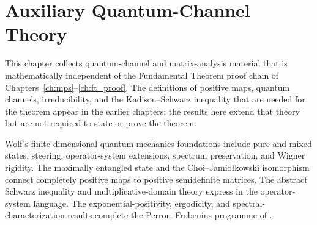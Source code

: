 \chapter{Auxiliary Quantum-Channel Theory}\label{ch:aux_channel_theory}

This chapter collects quantum-channel and matrix-analysis material that is
mathematically independent of the Fundamental Theorem proof chain of
Chapters~\ref{ch:mps}--\ref{ch:ft_proof}. The definitions of positive maps,
quantum channels, irreducibility, and the Kadison--Schwarz inequality that
are needed for the theorem appear in the earlier chapters; the results here
extend that theory but are not required to state or prove the theorem.

Wolf's finite-dimensional quantum-mechanics foundations include pure and
mixed states, steering, operator-system extensions, spectrum preservation,
and Wigner rigidity. The maximally entangled state and the
Choi--Jamio\l{}kowski isomorphism connect completely positive maps to positive
semidefinite matrices. The abstract Schwarz inequality and multiplicative-domain theory express
\cite[Chapter~5]{Wolf2012Quantum} in the operator-system language.  The
exponential-positivity, ergodicity, and spectral-characterization results
complete the Perron--Frobenius programme of
\cite[Chapter~6]{Wolf2012Quantum}.


